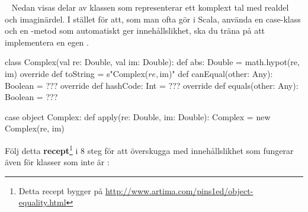 \Task \label{task:equals:Complex} \what~   Nedan visas delar av klassen  som representerar ett komplext tal med realdel och imaginärdel. I stället för att, som man ofta gör i Scala, använda en case-klass och en -metod som automatiskt ger innehållslikhet, ska du träna på att implementera en egen .
\begin{Code}
class Complex(val re: Double, val im: Double):
  def abs: Double = math.hypot(re, im)
  override def toString = s"Complex($re, $im)"
  def canEqual(other: Any): Boolean = ???
  override def hashCode: Int  = ???
  override def equals(other: Any): Boolean = ???

case object Complex:
  def apply(re: Double, im: Double): Complex = new Complex(re, im)
\end{Code}
Följ detta \textbf{recept}\footnote{Detta recept bygger på \url{http://www.artima.com/pins1ed/object-equality.html}} i 8 steg för att överskugga  med innehållslikhet som fungerar även för klasser som inte är :

